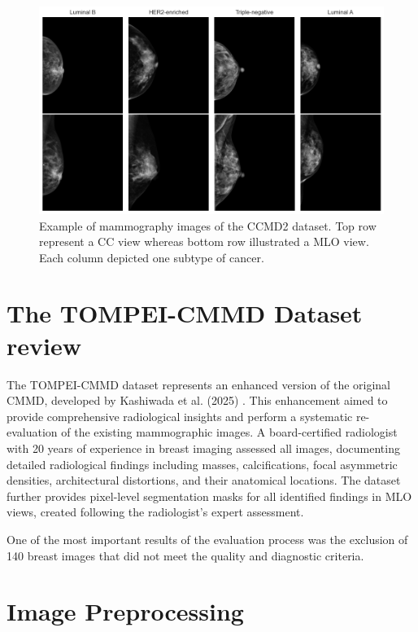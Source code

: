 \documentclass[a4paper,10pt]{book}
\begin{document}
\begin{figure}[h!]
	\centering
	\includegraphics[width=1\linewidth]{reports//assets/images_examples.png}
	\caption{Example of mammography images of the CCMD2 dataset. Top row represent a CC view whereas bottom row illustrated a MLO view. Each column depicted one subtype of cancer.}
	\label{fig:cmmd-examples}
\end{figure}

\newpage
\section{The TOMPEI-CMMD Dataset review}

The TOMPEI-CMMD dataset represents an enhanced version of the original CMMD, developed by Kashiwada et al. (2025) \cite{kashiwada_tompei-cmmd_2025}. This enhancement aimed to provide comprehensive radiological insights and perform a systematic re-evaluation of the existing mammographic images. A board-certified radiologist with 20 years of experience in breast imaging assessed all images, documenting detailed radiological findings including masses, calcifications, focal asymmetric densities, architectural distortions, and their anatomical locations. The dataset further provides pixel-level segmentation masks for all identified findings in MLO views, created following the radiologist's expert assessment. 

One of the most important results of the evaluation process was the exclusion of 140 breast images that did not meet the quality and diagnostic criteria. 

\section{Image Preprocessing}
\end{document}
